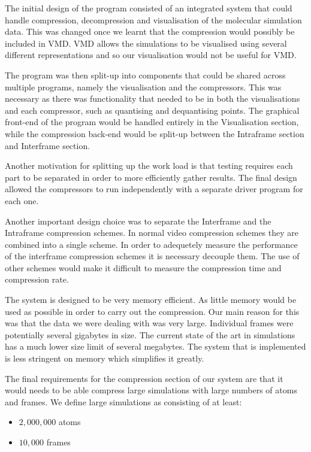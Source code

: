 \documentclass[a4paper,11pt]{report}
\begin{document}
The initial design of the program consisted of an integrated system that could handle compression, decompression and visualisation of the molecular simulation data. This was changed once we learnt that the compression would possibly be included in VMD. VMD allows the simulations to be visualised using several different representations and so our visualisation would not be useful for VMD.

The program was then split-up into components that could be shared across multiple programs, namely the visualisation and the compressors. This was necessary as there was functionality that needed to be in both the visualisations and each compressor, such as quantising and dequantising points. The graphical front-end of the program would be handled entirely in the Visualisation section, while the compression back-end would be split-up between the Intraframe section and Interframe section. 

Another motivation for splitting up the work load is that testing requires each part to be separated in order to more efficiently gather results. The final design allowed the compressors to run independently with a separate driver program for each one.

Another important design choice was to separate the Interframe and the Intraframe compression schemes. In normal video compression schemes they are combined into a single scheme. In order to adequetely measure the performance of the interframe compression schemes it is necessary decouple them. The use of other schemes would make it difficult to measure the compression time and compression rate. 
 
The system is designed to be very memory efficient. As little memory would be used as possible in order to carry out the compression. Our main reason for this was that the data we were dealing with was very large. Individual frames were potentially several gigabytes in size. The current state of the art in simulations has a much lower size limit of several megabytes\cite{JSconv}. The system that is implemented is less stringent on memory which simplifies it greatly.

The final requirements for the compression section of our system are that it would needs to be able compress large simulations with large numbers of atoms and frames. We define large simulations as consisting of at least:

\begin{itemize}
 \item $2,000,000$ atoms
 \item $10,000$ frames
\end{itemize}
\end{document}
